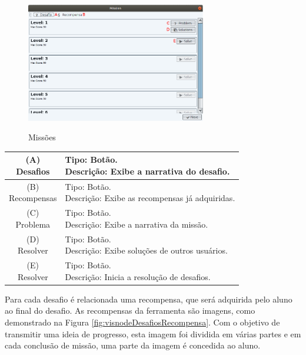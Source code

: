 \documentclass[
	12pt,				%
	oneside,			%
	a4paper,			%
	english,			%
	french,				%
	spanish,			%
	brazil,				%
	]{abntex2}
\begin{document}
\begin{figure}[H]
\centering
\caption{Missões}
\includegraphics[width=0.7\textwidth]{imagens/visnode_missoes.png}
\sourceAuthor
\label{fig:visnodeMissoes}
\end{figure}

\begin{table}[H]
\centering
{} \label{tab:listagemMissoes}
\renewcommand{\arraystretch}{1.8}
\setlength{\tabcolsep}{10pt}
\begin{tabular}{|c|l|}
  \hline
  \makecell{(A) \\ Desafios} 
  &
  \makecell[l]{Tipo: Botão.\\ Descrição: Exibe a narrativa do desafio.} \\
  \hline
  \makecell{(B) \\ Recompensas} 
  &
  \makecell[l]{Tipo: Botão.\\ Descrição: Exibe as recompensas já adquiridas.} \\
  \hline
  \makecell{(C) \\ Problema} 
  &
  \makecell[l]{Tipo: Botão.\\ Descrição: Exibe a narrativa da missão.} \\
  \hline  
  \makecell{(D) \\ Resolver} 
  &
  \makecell[l]{Tipo: Botão.\\ Descrição: Exibe soluções de outros usuários.} \\
  \hline  
  \makecell{(E) \\ Resolver} 
  &
  \makecell[l]{Tipo: Botão.\\ Descrição: Inicia a resolução de desafios.} \\
  \hline  
\end{tabular}
\centering
\sourceAuthor
\end{table}


Para cada desafio é relacionada uma recompensa, que será adquirida pelo aluno ao final do desafio. As recompensas da ferramenta são imagens, como demonstrado na Figura \ref{fig:visnodeDesafiosRecompensa}. Com o objetivo de transmitir uma ideia de progresso, esta imagem foi dividida em várias partes e em cada conclusão de missão, uma parte da imagem é concedida ao aluno.
\end{document}
